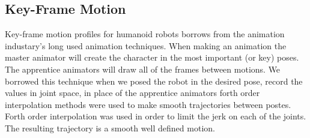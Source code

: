 \subsection{Key-Frame Motion}

Key-frame motion profiles for humanoid robots borrows from the animation industary's long used animation techniques.  When making an animation the master animator will create the character in the most important (or key) poses.  The apprentice animators will draw all of the frames between motions.  We borrowed this technique when we posed the robot in the desired pose, record the values in joint space, in place of the apprentice animators forth order interpolation methods were used to make smooth trajectories between postes.  Forth order interpolation was used in order to limit the jerk on each of the joints.  The resulting trajectory is a smooth well defined motion.